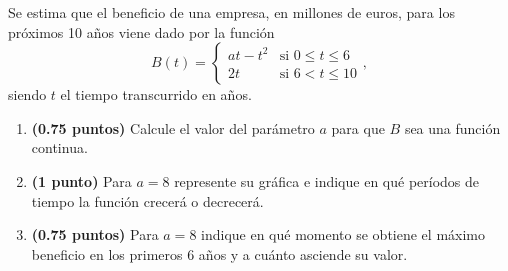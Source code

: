 
Se estima que el beneficio de una empresa, en millones de euros, para los próximos 10 años viene dado por la función
\[
B(t)=\begin{cases}
at-t^2&\text{si }0\leq t\leq6\\
2t&\text{si }6<t\leq10
\end{cases},
\]
siendo $t$ el tiempo transcurrido en años.
\begin{enumerate}[label=\alph*)]
\item \textbf{(0.75 puntos)} Calcule el valor del parámetro $a$ para que $B$ sea una función continua.
\item \textbf{(1 punto)} Para $a=8$ represente su gráfica e indique en qué períodos de tiempo la función crecerá o decrecerá.
\item \textbf{(0.75 puntos)} Para $a=8$ indique en qué momento se obtiene el máximo beneficio en los primeros 6 años y a cuánto asciende su valor.
\end{enumerate}

